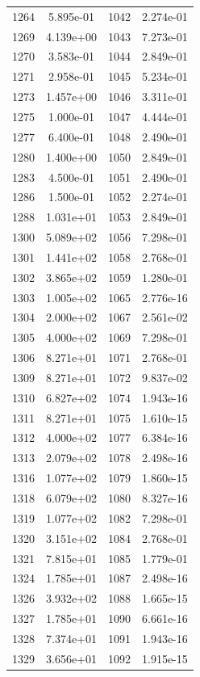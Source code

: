 \documentclass[12pt]{article}
\begin{document}
\begin{longtable}{@{}cccc@{}}
1264 & 5.895e-01 & 1042 & 2.274e-01 \\
1269 & 4.139e+00 & 1043 & 7.273e-01 \\
1270 & 3.583e-01 & 1044 & 2.849e-01 \\
1271 & 2.958e-01 & 1045 & 5.234e-01 \\
1273 & 1.457e+00 & 1046 & 3.311e-01 \\
1275 & 1.000e-01 & 1047 & 4.444e-01 \\
1277 & 6.400e-01 & 1048 & 2.490e-01 \\
1280 & 1.400e+00 & 1050 & 2.849e-01 \\
1283 & 4.500e-01 & 1051 & 2.490e-01 \\
1286 & 1.500e-01 & 1052 & 2.274e-01 \\
1288 & 1.031e+01 & 1053 & 2.849e-01 \\
1300 & 5.089e+02 & 1056 & 7.298e-01 \\
1301 & 1.441e+02 & 1058 & 2.768e-01 \\
1302 & 3.865e+02 & 1059 & 1.280e-01 \\
1303 & 1.005e+02 & 1065 & 2.776e-16 \\
1304 & 2.000e+02 & 1067 & 2.561e-02 \\
1305 & 4.000e+02 & 1069 & 7.298e-01 \\
1306 & 8.271e+01 & 1071 & 2.768e-01 \\
1309 & 8.271e+01 & 1072 & 9.837e-02 \\
1310 & 6.827e+02 & 1074 & 1.943e-16 \\
1311 & 8.271e+01 & 1075 & 1.610e-15 \\
1312 & 4.000e+02 & 1077 & 6.384e-16 \\
1313 & 2.079e+02 & 1078 & 2.498e-16 \\
1316 & 1.077e+02 & 1079 & 1.860e-15 \\
1318 & 6.079e+02 & 1080 & 8.327e-16 \\
1319 & 1.077e+02 & 1082 & 7.298e-01 \\
1320 & 3.151e+02 & 1084 & 2.768e-01 \\
1321 & 7.815e+01 & 1085 & 1.779e-01 \\
1324 & 1.785e+01 & 1087 & 2.498e-16 \\
1326 & 3.932e+02 & 1088 & 1.665e-15 \\
1327 & 1.785e+01 & 1090 & 6.661e-16 \\
1328 & 7.374e+01 & 1091 & 1.943e-16 \\
1329 & 3.656e+01 & 1092 & 1.915e-15 \\

\end{longtable}
\end{document}
